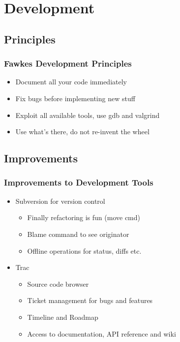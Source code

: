 %
%
%

\section{Development}


\subsection{Principles}
\begin{frame}
  \frametitle{Fawkes Development Principles}
  \begin{itemize}[<+>]
  \item Document all your code immediately
  \item Fix bugs before implementing new stuff
  \item Exploit all available tools, use gdb and valgrind
  \item Use what's there, do not re-invent the wheel
  \end{itemize}
\end{frame}

\subsection{Improvements}
\begin{frame}
  \frametitle{Improvements to Development Tools}
  \begin{itemize}
  \item<1> Subversion for version control
    \begin{itemize}
    \item Finally refactoring is fun (move cmd)
    \item Blame command to see originator
    \item Offline operations for status, diffs etc.
    \end{itemize}
  \item<2> Trac
    \begin{itemize}
    \item Source code browser
    \item Ticket management for bugs and features
    \item Timeline and Roadmap
    \item Access to documentation, API reference and wiki
    \end{itemize}
  \end{itemize}
\end{frame}

